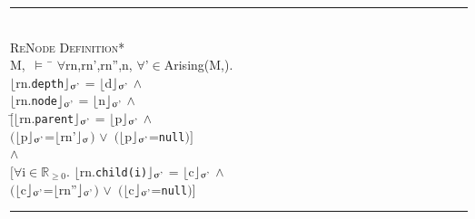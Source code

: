 \documentclass[a4paper,11pt, twoside,twocolumn]{article}
\newenvironment{logic}
{\begin{minipage}[c]{\linewidth}  \small \vspace{0.5em}\begin{tabbing}}
{\end{tabbing}\end{minipage}\vspace{0.5em}}
\newcommand{\loin}{$\in$}
\newcommand{\loforall}{$\forall$}
\newcommand{\loand}{$\land$}
\newcommand{\loor} {$\lor$}
\newcommand{\losigma}{\text{$\upsigma$}}
\newcommand{\loturns} {$\vDash$}
\newcommand{\loexec}[2] {$\lfloor$#1$\rfloor _{\text{#2}}$}
\newcommand{\hr}{\rule{\linewidth}{0.4pt}}
\begin{document}
\begin{logic} 
\hr\\
\textsc{\normalsize *ReNode Definition*}\\
M,\losigma\ \loturns\ \= \loforall rn,rn',rn'',n, \loforall \losigma'\loin Arising(M,\losigma).\\
\>\loexec{rn.\texttt{depth}}{\losigma'} = \loexec{d}{\losigma'} \loand \\
\>\loexec{rn.\texttt{node}}{\losigma'} = \loexec{n}{\losigma'} \loand \\
\>$[$\=\loexec{rn.\texttt{parent}}{\losigma'} = \loexec{p}{\losigma'} \loand \\
\>\>$($\loexec{p}{\losigma'}=\loexec{rn'}{\losigma}$)$ \loor\ $($\loexec{p}{\losigma'}=\texttt{null}$)]$\\
\>\loand \\
\>$[$\loforall i\loin$\mathbb{R}_{\geq 0}$. \loexec{rn.\texttt{child(i)}}{\losigma'} = \loexec{c}{\losigma'} \loand \\
\>\>$($\loexec{c}{\losigma'}=\loexec{rn''}{\losigma'}$)$ \loor\ $($\loexec{c}{\losigma'}=\texttt{null}$)]$ \\
\hr
\end{logic}
\end{document}
